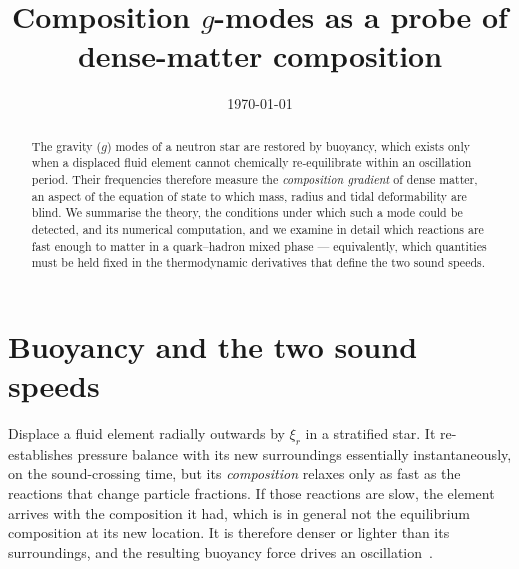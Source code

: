 \documentclass[aps,prd,twocolumn,superscriptaddress,nofootinbib,10pt]{revtex4-2}
\begin{document}
\title{Composition $g$-modes as a probe of dense-matter composition}

\author{}
\affiliation{}
\date{\today}

\begin{abstract}
The gravity ($g$) modes of a neutron star are restored by buoyancy, which
exists only when a displaced fluid element cannot chemically re-equilibrate
within an oscillation period. Their frequencies therefore measure the
\emph{composition gradient} of dense matter, an aspect of the equation of state
to which mass, radius and tidal deformability are blind. We summarise the
theory, the conditions under which such a mode could be detected, and its
numerical computation, and we examine in detail which reactions are fast enough
to matter in a quark--hadron mixed phase --- equivalently, which quantities must
be held fixed in the thermodynamic derivatives that define the two sound speeds.
\end{abstract}

\maketitle

\section{Buoyancy and the two sound speeds}

Displace a fluid element radially outwards by $\xi_r$ in a stratified star. It
re-establishes pressure balance with its new surroundings essentially
instantaneously, on the sound-crossing time, but its \emph{composition} relaxes
only as fast as the reactions that change particle fractions. If those
reactions are slow, the element arrives with the composition it had, which is
in general not the equilibrium composition at its new location. It is therefore
denser or lighter than its surroundings, and the resulting buoyancy force
drives an oscillation~\cite{ReiseneggerGoldreich1992}.
\end{document}

